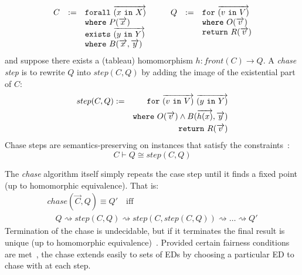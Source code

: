 \documentclass[preprint]{sigplanconf}
\newcommand{\FOR}{{\tt for} \ }
\newcommand{\FORALL}{{\tt forall} \ }
\newcommand{\EXISTS}{{\tt exists} \ }
\newcommand{\WHERE}{{\tt where} \ }
\newcommand{\IN}{ \ {\tt in} \ }
\newcommand{\RETURN}{{\tt return} \ }
\begin{document}
\[
\begin{array}{ccc} %
\begin{array}[t]{rcl}
 C & := & \FORALL \overrightarrow{(x \IN X)} \\
 & & \WHERE P(\overrightarrow{x}) \\
 & & \EXISTS \overrightarrow{(y \IN Y)} \\
 & & \WHERE B(\overrightarrow{x}, \overrightarrow{y})
\end{array} & &
\begin{array}[t]{rcl}
Q & := & \FOR \overrightarrow{(v \IN V)} \\
 & & \WHERE  O(\overrightarrow{v}) \\ 
 & & \RETURN R(\overrightarrow{v})
\end{array}
\end{array}
\]
and suppose there exists a (tableau) homomorphism $h : front(C) \to Q$.  A {\it chase step} is to rewrite $Q$ into $step(C,Q)$ by adding the image of the existential part of $C$:
\begin{eqnarray*}
step(C,Q) & := & \FOR \overrightarrow{(v \IN V)} \ \overrightarrow{(y \IN Y)} \\
 & & \WHERE  O(\overrightarrow{v}) \wedge B(\overrightarrow{h(x)}, \overrightarrow{y}) 
\\
 & & \RETURN R(\overrightarrow{v})
\end{eqnarray*}
Chase steps are semantics-preserving on instances that satisfy the constraints~\cite{Popa99anequational}:
\[
C \vdash Q \cong step(C,Q)
\]

The {\it chase} algorithm itself simply repeats the case step until it finds a fixed point (up to homomorphic equivalence).
That is:
\[\begin{array}{l}
chase(\vec{C},Q) \equiv Q' \quad \textrm{iff} \\
\quad Q \rightsquigarrow step(C, Q) \rightsquigarrow step(C, step(C, Q)) \rightsquigarrow \ldots \rightsquigarrow Q'
\end{array}
\]
Termination of the chase is undecidable, but if it terminates the final result is unique (up to homomorphic equivalence)~\cite{Deutsch:2006:QRC:1121995.1122010}.  Provided certain fairness conditions are met~\cite{Deutsch:2006:QRC:1121995.1122010}, the chase extends easily to sets of EDs by choosing a particular ED to chase with at each step.
\end{document}
